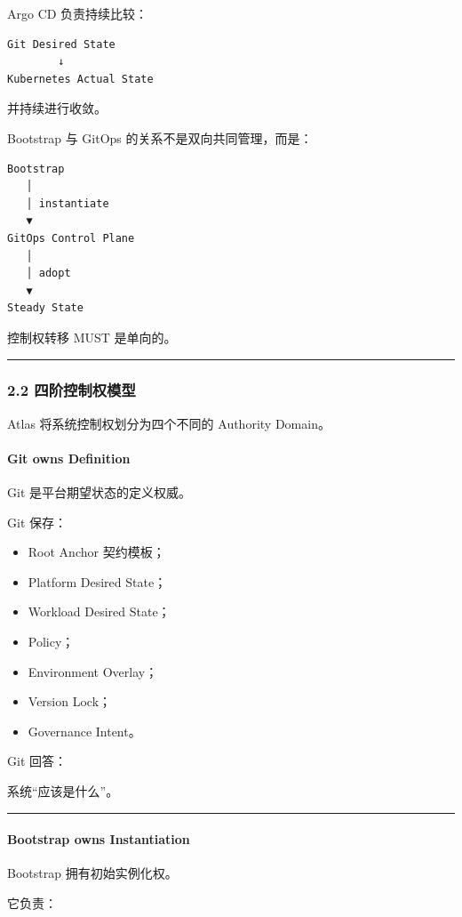 \documentclass[11pt,a4paper]{article}
\begin{document}
Argo CD 负责持续比较：

\begin{lstlisting}[language=text]
Git Desired State
        ↓
Kubernetes Actual State
\end{lstlisting}
并持续进行收敛。

Bootstrap 与 GitOps 的关系不是双向共同管理，而是：

\begin{lstlisting}[language=text]
Bootstrap
   │
   │ instantiate
   ▼
GitOps Control Plane
   │
   │ adopt
   ▼
Steady State
\end{lstlisting}
控制权转移 MUST 是单向的。

\vspace{0.5em}\hrule\vspace{0.5em}
\subsubsection{2.2 四阶控制权模型}
Atlas 将系统控制权划分为四个不同的 Authority Domain。

\paragraph{Git owns Definition}
Git 是平台期望状态的定义权威。

Git 保存：

\begin{itemize}
  \item Root Anchor 契约模板；
  \item Platform Desired State；
  \item Workload Desired State；
  \item Policy；
  \item Environment Overlay；
  \item Version Lock；
  \item Governance Intent。
\end{itemize}
Git 回答：

\begin{gfmBlockquote}
系统“应该是什么”。
\end{gfmBlockquote}
\vspace{0.5em}\hrule\vspace{0.5em}
\paragraph{Bootstrap owns Instantiation}
Bootstrap 拥有初始实例化权。

它负责：
\end{document}
